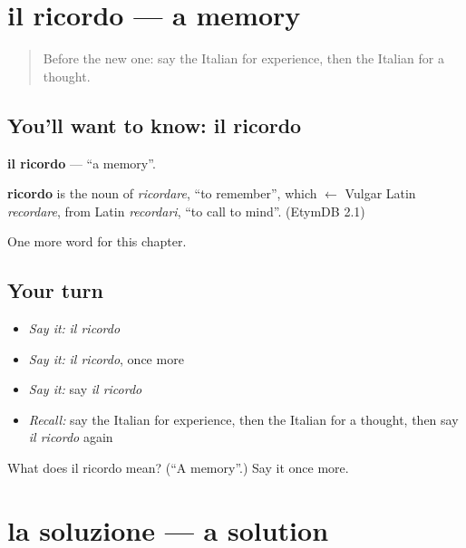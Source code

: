 \section[il ricordo]{il ricordo — a memory}

\label{lesson:IT-C196-ricordo}



\begin{quote}
Before the new one: say the Italian for experience, then the Italian for a thought.
\end{quote}

\subsection*{You'll want to know: il ricordo}
\textbf{il ricordo} — \textquotedblleft{}a memory\textquotedblright{}.

\begin{cousinweb}
\textbf{ricordo} is the noun of \emph{ricordare}, \textquotedblleft{}to remember\textquotedblright{}, which $\leftarrow$ Vulgar Latin \emph{recordare}, from Latin \emph{recordari}, \textquotedblleft{}to call to mind\textquotedblright{}. (EtymDB 2.1)
\end{cousinweb}

\begin{grammarlens}[title={What you've built}]
One more word for this chapter.
\end{grammarlens}

\subsection*{Your turn}
\begin{itemize}
\raggedright
  \item \emph{Say it:} \emph{il ricordo}
  \item \emph{Say it:} \emph{il ricordo}, once more
  \item \emph{Say it:} say \emph{il ricordo}
  \item \emph{Recall:} say the Italian for experience, then the Italian for a thought, then say \emph{il ricordo} again
\end{itemize}

\begin{tcolorbox}[breakable,colback=teal!4,colframe=teal!35!black,title={Before you move on}]
What does il ricordo mean? (\textquotedblleft{}A memory\textquotedblright{}.) Say it once more.
\end{tcolorbox}
\section[la soluzione]{la soluzione — a solution}

